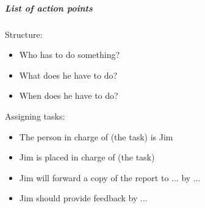 \subparagraph{List of action points}

Structure:\\
\begin{itemize}
\item Who has to do something?
\item What does he have to do?
\item When does he have to do?
\end{itemize}

Assigning tasks:\\
\begin{itemize}
\item The person in charge of (the task) is Jim
\item Jim is placed in charge of (the task)
\item Jim will forward a copy of the report to ... by ...
\item Jim should provide feedback by ...
\end{itemize}
